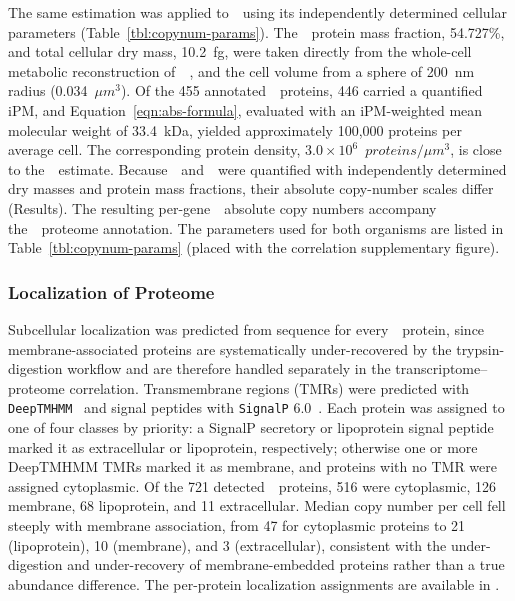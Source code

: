 The same estimation was applied to~\syna~using its independently determined cellular parameters (Table~\ref{tbl:copynum-params}).
The~\syna~protein mass fraction, 54.727\%, and total cellular dry mass, 10.2~fg, were taken directly from the whole-cell metabolic reconstruction of~\syna~\citep{breuer_essential_2019}, and the cell volume from a sphere of 200~nm radius (0.034~$\mu m^3$).
Of the 455 annotated~\syna~proteins, 446 carried a quantified iPM, and Equation~\ref{eqn:abs-formula}, evaluated with an iPM-weighted mean molecular weight of 33.4~kDa, yielded approximately 100{,}000 proteins per average cell.
The corresponding protein density, $3.0\times10^{6}$~$proteins/\mu m^{3}$, is close to the~\syn~estimate.
Because~\syn~and~\syna~were quantified with independently determined dry masses and protein mass fractions, their absolute copy-number scales differ (Results).
The resulting per-gene~\syna~absolute copy numbers accompany the~\syna~proteome annotation.
The parameters used for both organisms are listed in Table~\ref{tbl:copynum-params} (placed with the correlation supplementary figure).

\subsubsection{Localization of Proteome}

Subcellular localization was predicted from sequence for every~\syn~protein, since membrane-associated proteins are systematically under-recovered by the trypsin-digestion workflow and are therefore handled separately in the transcriptome--proteome correlation.
Transmembrane regions (TMRs) were predicted with \texttt{DeepTMHMM}~\cite{hallgren_deeptmhmm_2022} and signal peptides with \texttt{SignalP} 6.0~\cite{teufel_signalp_2022}.
Each protein was assigned to one of four classes by priority: a SignalP secretory or lipoprotein signal peptide marked it as extracellular or lipoprotein, respectively; otherwise one or more DeepTMHMM TMRs marked it as membrane, and proteins with no TMR were assigned cytoplasmic.
Of the 721 detected~\syn~proteins, 516 were cytoplasmic, 126 membrane, 68 lipoprotein, and 11 extracellular.
Median copy number per cell fell steeply with membrane association, from 47 for cytoplasmic proteins to 21 (lipoprotein), 10 (membrane), and 3 (extracellular), consistent with the under-digestion and under-recovery of membrane-embedded proteins rather than a true abundance difference.
The per-protein localization assignments are available in \sdomics.

